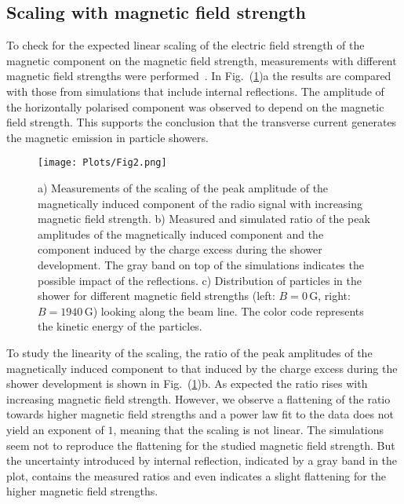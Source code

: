 \documentclass[epj]{webofc}
\newcommand*{\figref}[1]{Fig.~(\ref{fig:#1})}
\newcommand*{\figlab}[1]{\label{fig:#1}}
\begin{document}
\subsection{Scaling with magnetic field strength}
\vspace{-0.15cm}
To check for the expected linear scaling of the electric field strength of the magnetic component on the magnetic field strength, measurements with different magnetic field strengths were performed~\cite{PRL}. In \figref{Scaling}a the results are compared with those from simulations that include internal reflections. The amplitude of the horizontally polarised component was observed to depend on the magnetic field strength. This supports the conclusion that the transverse current generates the magnetic emission in particle showers.
%
\begin{figure}
\centering
\texttt{[image: Plots/Fig2.png]}
\caption{a) Measurements of the scaling of the peak amplitude of the magnetically induced component of the radio signal with increasing magnetic field strength. b) Measured and simulated ratio of the peak amplitudes of the magnetically induced component and the component induced by the charge excess during the shower development. The gray band on top of the simulations indicates the possible impact of the reflections. c) Distribution of particles in the shower for different magnetic field strengths (left: $B=0\,\mbox{G}$, right: $B=1940\,\mbox{G}$) looking along the beam line. The color code represents the kinetic energy of the particles.}
\figlab{Scaling}       %
\end{figure}
%
To study the linearity of the scaling, the ratio of the peak amplitudes of the magnetically induced component to that induced by the charge excess during the shower development is shown in \figref{Scaling}b. As expected the ratio rises with increasing magnetic field strength. 
However, we observe a flattening of the ratio towards higher magnetic field strengths and a power law fit to the data does not yield an exponent of $1$, meaning that the scaling is not linear. 
The simulations seem not to reproduce the flattening for the studied magnetic field strength. But the uncertainty introduced by internal reflection, indicated by a gray band in the plot, contains the measured ratios and even indicates a slight flattening for the higher magnetic field strengths. 
\end{document}
